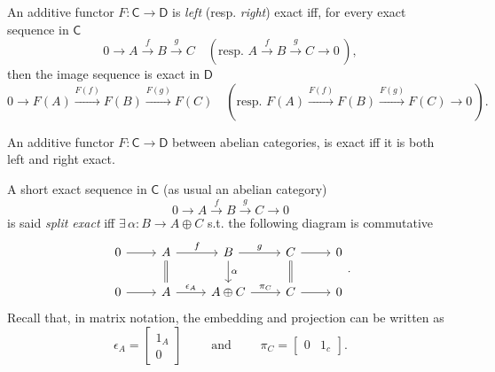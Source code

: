 \begin{defn}
	An additive functor $F: \mathsf{C} \to \mathsf{D}$ is {\em left} (resp. {\em right}) exact iff,
	for every exact sequence in $\mathsf{C}$
	\begin{equation}
		0 \to A \xrightarrow{f} B \xrightarrow{g} C \quad ( \text{resp. }
		A \xrightarrow{f} B \xrightarrow{g} C \to 0\, )
	,\end{equation} 
	then the image sequence is exact in $\mathsf{D}$ 
	\begin{equation}
		0 \to F(A) \xrightarrow{F(f)} F(B) \xrightarrow{F(g)} F(C) \quad ( \text{resp. }
		F(A) \xrightarrow{F(f)} F(B) \xrightarrow{F(g)} F(C) \to 0\, )
	.\end{equation} 
\end{defn}

\begin{prop}
	An additive functor $F: \mathsf{C} \to \mathsf{D}$ between abelian categories,
	is exact iff it is both left and right exact.
\end{prop} 

\begin{defn}
	A short exact sequence in $\mathsf{C}$ (as usual an abelian category)
	\begin{equation}
	0 \to A \xrightarrow{f} B \xrightarrow{g} C \to 0 
	\end{equation} 
	is said {\em split exact} iff $\exists\, \alpha: B \to A \oplus C$ s.t. the following diagram is commutative
	\begin{equation}
	\begin{tikzcd}
		0 \arrow[r, "", rightarrow] &
		A \arrow[r, "f", rightarrow] \arrow[d, "", equal] &
		B \arrow[r, "g", rightarrow] \arrow[d, "\alpha", rightarrow] &
		C \arrow[r, "", rightarrow] \arrow[d, "", equal] &
		0\\
		0 \arrow[r, "", rightarrow] &
		A \arrow[r, "\epsilon_A", rightarrow] &
		A \oplus C \arrow[r, "\pi_C", rightarrow] &
		C \arrow[r, "", rightarrow] &
		0
	\end{tikzcd}
	.\end{equation} 
	Recall that, in matrix notation, the embedding and projection can be written as
	 \begin{equation}
	\epsilon_A = 
	\begin{bmatrix}
		1_A\\ 0
	\end{bmatrix} \qquad \text{ and } \qquad
	\pi_C = 
	\begin{bmatrix}
		0 & 1_c
	\end{bmatrix} 
	.\end{equation} 
\end{defn}

